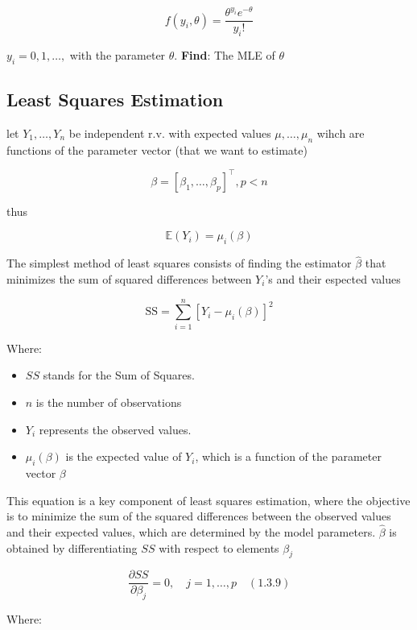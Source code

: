 \documentclass[11pt]{article}
\begin{document}
\begin{equation}
    f(y_i, \theta) = \dfrac{\theta^{y_i} e^{-\theta}}{y_i !}
\end{equation}

$y_i = 0, 1,\dots,$ with the parameter $\theta$. \textbf{Find}: The MLE of $\theta$

\subsection{Least Squares Estimation}

let $Y_1,\dots,Y_n$ be independent r.v. with expected values $\mu, \dots , \mu_n$ wihch are functions of the parameter vector (that we want to estimate)

\[\beta = [\beta_1 ,\dots, \beta_p]^{\top}, p < n\]

thus

\[\mathbb{E}(Y_{i}) = \mu_i (\beta)\]

The simplest method of least squares consists of finding the estimator $\hat{\beta}$ that minimizes the sum of squared differences between $Y_{i}$'s and their espected values

\begin{equation}
    \text{SS} = \sum_{i=1}^{n} [Y_i - \mu_i(\beta)]^2
\end{equation}

Where:
\begin{itemize}
    \item $SS$ stands for the Sum of Squares.
    \item $n$ is the number of observations
    \item $Y_i$ represents the observed values.
    \item $\mu_i (\beta)$ is the expected value of $Y_i$, which is a function of the parameter vector $\beta$
\end{itemize}

This equation is a key component of least squares estimation, where the objective is to minimize the sum of the squared differences between the observed values and their expected values, which are determined by the model parameters. $\hat{\beta}$ is obtained by differentiating $SS$ with respect to elements $\beta_j$

\begin{equation}
    \dfrac{\partial SS}{\partial \beta_j} = 0, \quad j = 1, \ldots, p \quad (1.3.9)
\end{equation}

Where:
\end{document}
